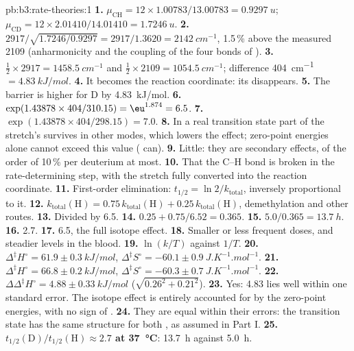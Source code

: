 \begin{solution}{pb:b3:rate-theories:1}
\textbf{1.} $\mu_{\mathrm{CH}} = 12 \times 1.00783/13.00783 = \qty{0.9297}{u}$; $\mu_{\mathrm{CD}} = 12 \times 2.01410/14.01410 =
\qty{1.7246}{u}$.
\textbf{2.} $2917/\sqrt{1.7246/0.9297} = 2917/1.3620 = \qty{2142}{cm^{-1}}$, 1.5\,\% above the
measured 2109 (anharmonicity and the coupling of the four bonds of ).
\textbf{3.} $\frac12 \times 2917 = \qty{1458.5}{cm^{-1}}$ and $\frac12 \times 2109 = \qty{1054.5}{cm^{-1}}$; difference
\qty{404}{cm^{-1}} $= \qty{4.83}{kJ/mol}$.
\textbf{4.} It becomes the reaction coordinate: its  disappears.
\textbf{5.} The barrier is higher for D by \qty{4.83}{kJ/mol}.
\textbf{6.} $\exp(1.43878 \times 404/310.15) = \eu^{1.874} = 6.5$.
\textbf{7.} $\exp(1.43878 \times 404/298.15) = 7.0$.
\textbf{8.} In a real transition state part of the stretch's 
survives in other modes, which lowers the effect; zero-point energies alone
cannot exceed this value ( can).
\textbf{9.} Little: they are secondary effects, of the order of 10\,\% per deuterium at
most.
\textbf{10.} That the C--H bond is broken in the rate-determining step, with the
stretch fully converted into the reaction coordinate.
\textbf{11.} First-order elimination: $t_{1/2} = \ln2/k_{\mathrm{total}}$, inversely proportional to it.
\textbf{12.} $k_{\mathrm{total}}(\mathrm H) = 0.75\,k_{\mathrm{total}}(\mathrm H) + 0.25\,k_{\mathrm{total}}(\mathrm H)$, demethylation and other routes.
\textbf{13.} Divided by 6.5.
\textbf{14.} $0.25 + 0.75/6.52 = 0.365$.
\textbf{15.} $5.0/0.365 = \qty{13.7}{h}$.
\textbf{16.} 2.7.
\textbf{17.} 6.5, the full isotope effect.
\textbf{18.} Smaller or less frequent doses, and steadier levels in the blood.
\textbf{19.} $\ln(k/T)$ against $1/T$.
\textbf{20.} $\Delta^{\ddagger}H^\circ = 61.9 \pm \qty{0.3}{kJ/mol}$, $\Delta^{\ddagger}S^\circ = -60.1 \pm \qty{0.9}{J.K^{-1}.mol^{-1}}$.
\textbf{21.} $\Delta^{\ddagger}H^\circ = 66.8 \pm \qty{0.2}{kJ/mol}$, $\Delta^{\ddagger}S^\circ = -60.3 \pm \qty{0.7}{J.K^{-1}.mol^{-1}}$.
\textbf{22.} $\Delta\Delta^{\ddagger}H^\circ = 4.88 \pm \qty{0.33}{kJ/mol}$ ($\sqrt{0.26^2 + 0.21^2}$).
\textbf{23.} Yes: 4.83 lies well within one standard error. The isotope effect is
entirely accounted for by the zero-point energies, with no sign of .
\textbf{24.} They are equal within their errors: the transition state has the same
structure for both , as assumed in Part I.
\textbf{25.} \textbf{$t_{1/2}(\mathrm D)/t_{1/2}(\mathrm H) \approx 2.7$ at \qty{37}{\celsius}}: \qty{13.7}{h} against \qty{5.0}{h}.
\end{solution}
